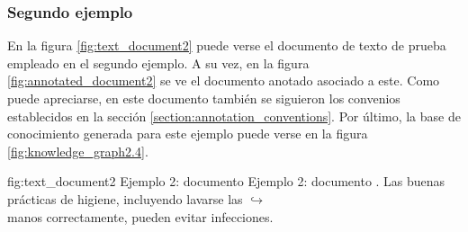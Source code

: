 \subsubsection{Segundo ejemplo}
\vspace{-0.1in}
En la figura \ref{fig:text_document2} puede verse el documento de texto de prueba empleado en el segundo ejemplo. A su vez, en la figura \ref{fig:annotated_document2} se ve el documento anotado asociado a este. Como puede apreciarse, en este documento también se siguieron los convenios establecidos en la sección \ref{section:annotation_conventions}. Por último, la base de conocimiento generada para este ejemplo puede verse en la figura \ref{fig:knowledge_graph2.4}.

\vspace{-0.1in}
\begin{annexample}
[backgroundcolor=black!5]
{\textwidth}
{fig:text_document2}
{Ejemplo 2: documento }
{Ejemplo 2: documento .}
	Las buenas prácticas de higiene, incluyendo lavarse las {\scriptsize $\hookrightarrow$}\\
	manos correctamente, pueden evitar infecciones.
\end{annexample}

